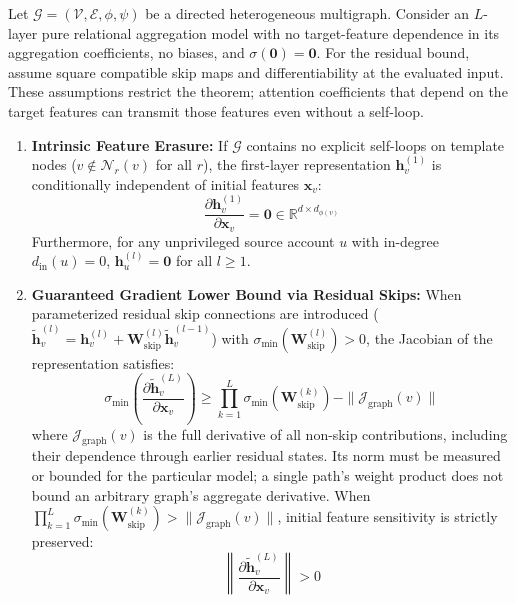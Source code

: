 \begin{theorem}
\label{thm:theorem1}
Let $\mathcal{G} = (\mathcal{V}, \mathcal{E}, \phi, \psi)$ be a directed heterogeneous multigraph. Consider an $L$-layer pure relational aggregation model with no target-feature dependence in its aggregation coefficients, no biases, and $\sigma(\mathbf{0})=\mathbf{0}$. For the residual bound, assume square compatible skip maps and differentiability at the evaluated input. These assumptions restrict the theorem; attention coefficients that depend on the target features can transmit those features even without a self-loop.
\begin{enumerate}
    \item \textbf{Intrinsic Feature Erasure:} If $\mathcal{G}$ contains no explicit self-loops on template nodes ($v \notin \mathcal{N}_r(v)$ for all $r$), the first-layer representation $\mathbf{h}_v^{(1)}$ is conditionally independent of initial features $\mathbf{x}_v$:
    \begin{equation}
    \frac{\partial \mathbf{h}_v^{(1)}}{\partial \mathbf{x}_v} = \mathbf{0} \in \mathbb{R}^{d \times d_{\phi(v)}}
    \end{equation}
    Furthermore, for any unprivileged source account $u$ with in-degree $d_{\text{in}}(u) = 0$, $\mathbf{h}_u^{(l)} = \mathbf{0}$ for all $l \ge 1$.
    \item \textbf{Guaranteed Gradient Lower Bound via Residual Skips:} When parameterized residual skip connections are introduced ($\tilde{\mathbf{h}}_v^{(l)} = \mathbf{h}_v^{(l)} + \mathbf{W}_{\text{skip}}^{(l)} \tilde{\mathbf{h}}_v^{(l-1)}$) with $\sigma_{\min}(\mathbf{W}_{\text{skip}}^{(l)}) > 0$, the Jacobian of the representation satisfies:
    \begin{equation}
    \sigma_{\min} \left( \frac{\partial \tilde{\mathbf{h}}_v^{(L)}}{\partial \mathbf{x}_v} \right) \ge \prod_{k=1}^L \sigma_{\min}(\mathbf{W}_{\text{skip}}^{(k)}) - \|\mathcal{J}_{\text{graph}}(v)\|
    \end{equation}
    where $\mathcal{J}_{\text{graph}}(v)$ is the full derivative of all non-skip contributions, including their dependence through earlier residual states. Its norm must be measured or bounded for the particular model; a single path's weight product does not bound an arbitrary graph's aggregate derivative. When $\prod_{k=1}^L \sigma_{\min}(\mathbf{W}_{\text{skip}}^{(k)}) > \|\mathcal{J}_{\text{graph}}(v)\|$, initial feature sensitivity is strictly preserved:
    \begin{equation}
    \left\| \frac{\partial \tilde{\mathbf{h}}_v^{(L)}}{\partial \mathbf{x}_v} \right\| > 0
    \end{equation}
\end{enumerate}
\end{theorem}

